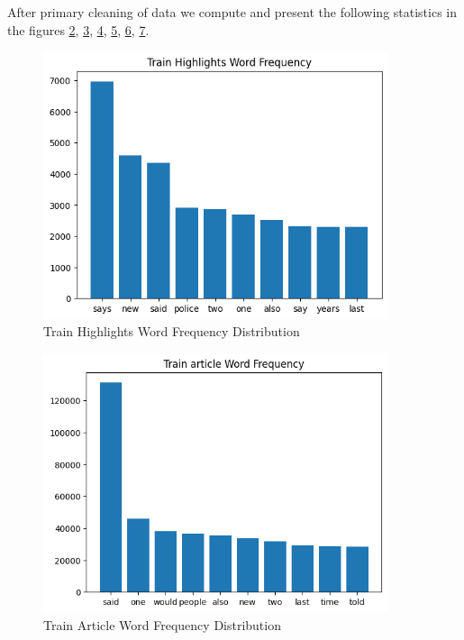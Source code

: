 \documentclass{article}
\begin{document}
After primary cleaning of data we compute and present the following statistics in the figures \hyperref[fig:word_freq]{2}, \hyperref[fig:word_freq_1]{3}, \hyperref[fig:word_freq_2]{4}, \hyperref[fig:word_freq_3]{5}, \hyperref[fig:word_freq_4]{6}, \hyperref[fig:word_freq_5]{7}.
\begin{figure}[h]
    \label{fig:word_freq}
    \centering
    \includegraphics[width=0.9\textwidth]{trainf.png}
    \caption{Train Highlights Word Frequency Distribution}
\end{figure}
\begin{figure}[h]
    \label{fig:word_freq_1}
    \centering
    \includegraphics[width=0.9\textwidth]{trainaf.png}
    \caption{Train Article Word Frequency Distribution}
\end{figure}
\end{document}
